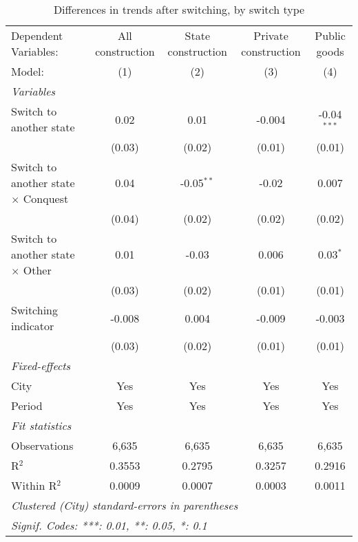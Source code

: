 \begin{table}[htbp]
   \caption{\label{tab:baseline_50y} Differences in trends after switching, by switch type}
   \centering
   \begin{tabular}{lcccc}
      \tabularnewline \midrule \midrule
      Dependent Variables:                       & All construction & State construction & Private construction & Public goods\\  
      Model:                                     & (1)              & (2)                & (3)                  & (4)\\  
      \midrule
      \emph{Variables}\\
      Switch to another state                    & 0.02             & 0.01               & -0.004               & -0.04$^{***}$\\   
                                                 & (0.03)           & (0.02)             & (0.01)               & (0.01)\\   
      Switch to another state $\times$ Conquest  & 0.04             & -0.05$^{**}$       & -0.02                & 0.007\\   
                                                 & (0.04)           & (0.02)             & (0.02)               & (0.02)\\   
      Switch to another state $\times$ Other     & 0.01             & -0.03              & 0.006                & 0.03$^{*}$\\   
                                                 & (0.03)           & (0.02)             & (0.01)               & (0.01)\\   
      Switching indicator                        & -0.008           & 0.004              & -0.009               & -0.003\\   
                                                 & (0.03)           & (0.02)             & (0.01)               & (0.01)\\   
      \midrule
      \emph{Fixed-effects}\\
      City                                       & Yes              & Yes                & Yes                  & Yes\\  
      Period                                     & Yes              & Yes                & Yes                  & Yes\\  
      \midrule
      \emph{Fit statistics}\\
      Observations                               & 6,635            & 6,635              & 6,635                & 6,635\\  
      R$^2$                                      & 0.3553           & 0.2795             & 0.3257               & 0.2916\\  
      Within R$^2$                               & 0.0009           & 0.0007             & 0.0003               & 0.0011\\  
      \midrule \midrule
      \multicolumn{5}{l}{\emph{Clustered (City) standard-errors in parentheses}}\\
      \multicolumn{5}{l}{\emph{Signif. Codes: ***: 0.01, **: 0.05, *: 0.1}}\\
   \end{tabular}
   

\end{table}
